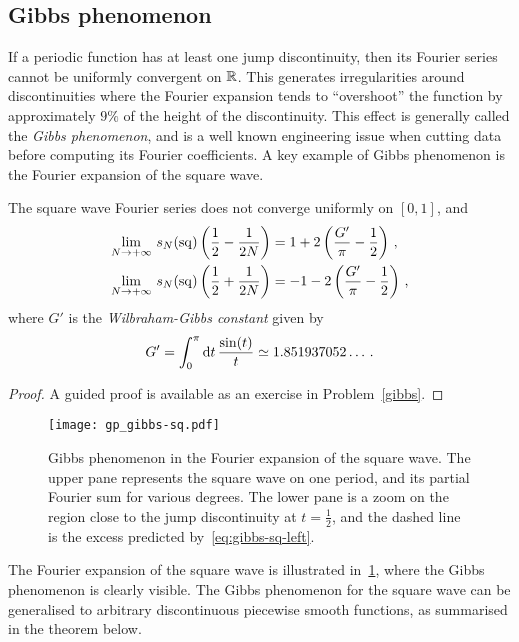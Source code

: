 \subsection{Gibbs phenomenon}
If a periodic function has at least one jump discontinuity, then its Fourier series cannot
be uniformly convergent on $\mathbb{R}$. This generates irregularities around discontinuities
where the Fourier expansion tends to ``overshoot'' the function by approximately $9\%$ of
the height of the discontinuity. This effect is generally called the \emph{Gibbs
phenomenon}, and is a well known engineering issue when cutting data before computing its
Fourier coefficients. A key example of Gibbs phenomenon is the Fourier expansion of the
square wave.
\begin{lemma}
  \label{lem:gibbs-sq}
  The square wave Fourier series does not converge uniformly on $[0,1]$, and
  \begin{align}
    \lim_{N\to+\infty}\,s_N(\operatorname{sq})\left(\frac12-\frac{1}{2N}\right)
    &=1+2\left(\frac{G'}{\pi}-\frac12\right)\,,\label{eq:gibbs-sq-left}\\
    \lim_{N\to+\infty}\,s_N(\operatorname{sq})\left(\frac12+\frac{1}{2N}\right)
    &=-1-2\left(\frac{G'}{\pi}-\frac12\right)\,,\label{eq:gibbs-sq-right}
  \end{align}
  where $G'$ is the \emph{Wilbraham-Gibbs constant} given by
  \begin{equation}
    G'=\int_0^\pi\mathrm{d} t\,\frac{\sin(t)}{t}\simeq1.851937052\dots\,.
  \end{equation}
\end{lemma}
\begin{proof}
  A guided proof is available as an exercise in Problem~\ref{gibbs}.
\end{proof}
\begin{figure}[t]
  \centering
  \texttt{[image: gp\_gibbs-sq.pdf]}
  \caption{Gibbs phenomenon in the Fourier expansion of the square wave. The upper pane
    represents the square wave on one period, and its partial Fourier sum for various
    degrees. The lower pane is a zoom on the region close to the jump discontinuity at
  $t=\frac12$, and the dashed line is the excess predicted by~\cref{eq:gibbs-sq-left}.}
  \label{fig:gibbs-sq}
\end{figure}
The Fourier expansion of the square wave is illustrated in~\cref{fig:gibbs-sq}, where the
Gibbs phenomenon is clearly visible. The Gibbs phenomenon for the square wave can be
generalised to arbitrary discontinuous piecewise smooth functions, as summarised in the
theorem below.
